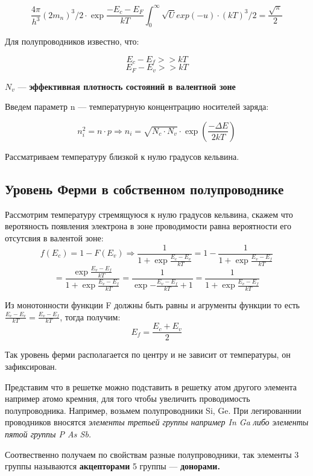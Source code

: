 \documentclass[../main.tex]{subfiles}
\begin{document}
\[\frac{4 \pi}{h^3}(2m_n)^3/2 \cdot\exp{\frac{- E_c - E_F}{kT}} \int_{0}^{\infty} \sqrt{U}exp(-u) \cdot (kT)^3/2 = \frac{\sqrt{\pi}}{2} \]

Для полупроводников известно, что: 

\[E_c - E_f >> kT\]
\[E_F - E_v >> kT\]

$N_v$ --- \textbf{эффективная плотность состояний в валентной зоне}

Введем параметр n --- температурную концентрацию носителей заряда:

\[
\boxed{
n_i^2 = n \cdot p \Rightarrow 
n_i = \sqrt{N_c \cdot N_v} \cdot 
\exp\!\left(\frac{- \Delta E}{2 k T}\right)
}
\]

Рассматриваем температуру близкой к нулю градусов кельвина.

\subsection{Уровень Ферми в собственном полупроводнике}

Рассмотрим температуру стремящуюся к нулю градусов кельвина, скажем что веротяность появления электрона в зоне проводимости равна вероятности его отсутсвия в валентой зоне:
\[f(E_c) = 1 - F(E_v) \Rightarrow \frac{1}{1+ \exp{\frac{E_c - E_v}{kT}}} = 1 - \frac{1}{1+ \exp{\frac{E_v - E_f}{kT}}} \]
\[ = \frac{\exp{\frac{E_v- E_f}{kT}}}{1 + \exp{\frac{E_v - E_f}{kT}}} = \frac{1}{\exp{- \frac{E_v - E_f}{kT}} +1 } = \frac{1}{1+\exp{\frac{E_v - E_f}{kT}}}\]

Из монотонности функции F должны быть равны и агрументы функции то есть $\frac{E_c - E_v}{kT} = \frac{E_v - E_f}{kT}$, тогда получим:
\[E_f = \frac{E_c + E_v}{2}\]

Так уровень ферми располагается по центру и не зависит от температуры, он зафиксирован.

Представим что в решетке можно подставить в решетку атом другого элемента например атомо кремния, для того чтобы увеличить проводимость полупроводника.
Например, возьмем полупроводники Si, Ge. При легированнии проводников вносятся \textit{элементы третьей группы например In Ga} \textit{либо элементы пятой группы P As Sb.}

Соотвественно получаем по свойствам разные полупроводники, так элементы 3 группы называются \textbf{акцепторами} 5 группы --- \textbf{донорами.}
\end{document}
